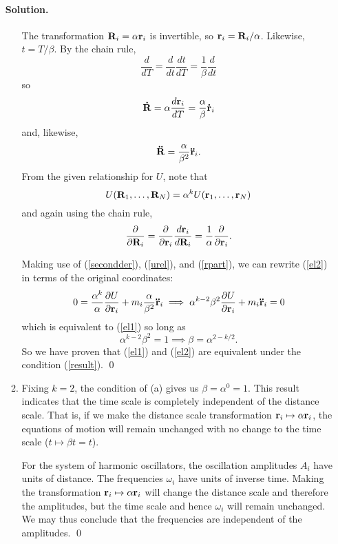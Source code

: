 \documentclass[11pt]{article}
\newcommand{\pder}[2]{\frac{\partial#1}{\partial#2}}
\newcommand{\der}[2]{\frac{d#1}{d#2}}
\newcommand{\refeq}[1]{(\ref{#1})}
\newenvironment{solution}
{
    \paragraph{Solution.}
    \ignorespaces
}
{
    \bigskip\bigskip
}
\begin{document}
\begin{enumerate}
\begin{solution}
\begin{enumerate}
			The transformation $\mathbf{R}_i = \alpha \mathbf{r}_i$ is invertible, so $\mathbf{r}_i = \mathbf{R}_i / \alpha$.  Likewise, $t = T / \beta$.  By the chain rule,
			\begin{equation} \label{transT}
				\der{}{T} = \der{}{t} \der{t}{T} = \frac{1}{\beta} \der{}{t}
			\end{equation}
			so
			\begin{equation}
				\vRd = \alpha \der{\vr_i}{T} = \frac{\alpha}{\beta} \vrd_i
			\end{equation}
			and, likewise,
			\begin{equation} \label{secondder}
				\mathbf{\ddot{R}} = \frac{\alpha}{\beta^2} \mathbf{\ddot{r}}_i.
			\end{equation}
			From the given relationship for $U$, note that
			\begin{equation} \label{urel}
				U(\mathbf{R}_1, \ldots, \mathbf{R}_N) = \alpha^k U(\mathbf{r}_1, \ldots, \mathbf{r}_N)
			\end{equation}
			and again using the chain rule,
			\begin{equation} \label{rpart}
				\pder{}{\vR_i} = \pder{}{\vr_i} \der{\vr_i}{\vR_i} = \frac{1}{\alpha} \pder{}{\vr_i}.
			\end{equation}

			Making use of \refeq{secondder}, \refeq{urel}, and \refeq{rpart}, we can rewrite \refeq{el2} in terms of the original coordinates:
			\begin{equation} 
			0 = \frac{\alpha^k}{\alpha} \pder{U}{\vr_i} + m_i \frac{\alpha}{\beta^2} \vrdd_i \implies \alpha^{k-2} \beta^2 \pder{U}{\vr_i} + m_i \vrdd_i = 0
			\end{equation}
			which is equivalent to \refeq{el1} so long as
			\begin{equation} \label{result}
				\alpha^{k-2} \beta^2 = 1 \implies \beta = \alpha^{{2-k}/2}.
			\end{equation}
			So we have proven that \refeq{el1} and \refeq{el2} are equivalent under the condition \refeq{result}. \qed
			
			
			\item Fixing $k = 2$, the condition of (a) gives us $\beta = \alpha^0 = 1$.  This result indicates that the time scale is completely independent of the distance scale.  That is, if we make the distance scale transformation $\mathbf{r}_i \mapsto \alpha \mathbf{r}_i$, the equations of motion will remain unchanged with no change to the time scale ($t \mapsto \beta t = t$).

			For the system of harmonic oscillators, the oscillation amplitudes $A_i$ have units of distance.  The frequencies $\omega_i$ have units of inverse time.  Making the transformation $\mathbf{r}_i \mapsto \alpha \mathbf{r}_i$ will change the distance scale and therefore the amplitudes, but the time scale and hence $\omega_i$ will remain unchanged.  We may thus conclude that the frequencies are independent of the amplitudes. \qed


\end{enumerate}
\end{solution}
\end{enumerate}
\end{document}
